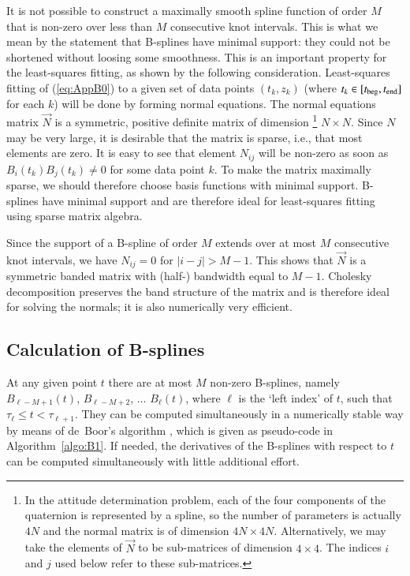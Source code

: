 \documentclass[structabstract]{aa}
\begin{document}
It is not possible to construct a maximally smooth spline function
of order $M$ that is non-zero over less than $M$ consecutive knot
intervals. This is what we mean by the statement that B-splines have
minimal support: they could not be shortened without loosing some
smoothness. This is an important property for the least-squares
fitting, as shown by the following consideration. Least-squares
fitting of (\ref{eq:AppB0}) to a given set of data points $(t_k,z_k)$
(where $t_k\in [t_{\rm beg},t_{\rm end}]$ for each $k$) will be
done by forming normal equations. The normal equations matrix
$\vec{N}$ is a symmetric, positive definite matrix of dimension%
\footnote{In the attitude determination problem, each of the four
components of the quaternion is represented by a spline, so the
number of parameters is actually $4N$ and the normal matrix is of
dimension $4N\times 4N$. Alternatively, we may take the elements
of $\vec{N}$ to be sub-matrices of dimension $4\times 4$. The
indices $i$ and $j$ used below refer to these sub-matrices.}
$N\times N$. Since $N$ may be very large, it is desirable that
the matrix is sparse, i.e., that most elements are zero. It is easy
to see that element $N_{ij}$ will be non-zero as soon as
$B_i(t_k)B_j(t_k)\ne 0$ for some data point $k$. To make
the matrix maximally sparse, we should therefore choose basis
functions with minimal support. B-splines have minimal support and
are therefore ideal for least-squares fitting using sparse matrix
algebra.

Since the support of a B-spline of order $M$ extends over at most $M$
consecutive knot intervals, we have $N_{ij}=0$ for $|i-j|>M-1$. This
shows that $\vec{N}$ is a symmetric banded matrix with (half-) bandwidth
equal to $M-1$. Cholesky decomposition preserves the band structure
of the matrix and is therefore ideal for solving the normals; it is
also numerically very efficient.

\subsection{Calculation of B-splines}\label{sec:calcBsplines}

At any given point $t$ there are at most $M$ non-zero B-splines,
namely $B_{\ell-M+1}(t)$, $B_{\ell-M+2}$, $\dots$ $B_{\ell}(t)$, where
$\ell$ is the `left index' of $t$, such that $\tau_\ell \le t < \tau_{\ell+1}$.
They can be computed simultaneously in a numerically stable way by
means of de~Boor's algorithm \citep{book:DB-01}, which is given as
pseudo-code in Algorithm~\ref{algo:B1}.
If needed, the derivatives of the B-splines with respect to $t$ can be
computed simultaneously with little additional effort.
\end{document}
